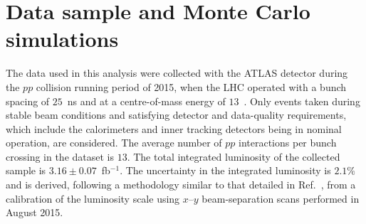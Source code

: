 \documentclass[cernpreprint,texlive=2016,txfonts,UKenglish]{latex/atlasdoc}
\def\fb1{fb$^{-1}$}
\begin{document}
\section{Data sample and Monte Carlo simulations}
\label{datmc}
The data used in this analysis were collected with the ATLAS detector
during the $pp$ collision running period of 2015, when the LHC
operated with a bunch spacing of $25$~ns and at a centre-of-mass
energy of $13$~\TeV. Only events taken during stable beam conditions
and satisfying detector and data-quality requirements, which include
the calorimeters and inner tracking detectors being in nominal
operation, are considered. The average number of $pp$ interactions per
bunch crossing in the dataset is $13$.  The total integrated
luminosity of the collected sample is {\mbox{$3.16 \pm 0.07$~\fb1}}.
The uncertainty in the integrated luminosity is $2.1\%$ and is
derived, following a methodology similar to that detailed in
Ref.~\cite{epj:c76:653}, from a calibration of the luminosity scale
using $x$--$y$ beam-separation scans performed in August 2015.
\end{document}
